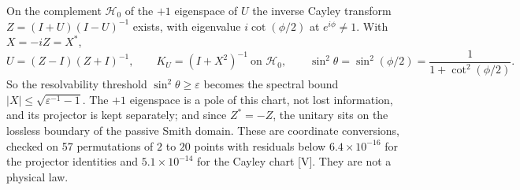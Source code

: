 \documentclass[11pt]{article}
\theoremstyle{remark}\newtheorem{remark}[theorem]{Remark}
\begin{document}
On the complement $\mathcal H_0$ of the $+1$ eigenspace of $U$ the inverse Cayley transform $Z=(I+U)(I-U)^{-1}$ exists, with eigenvalue $i\cot(\phi/2)$ at $e^{i\phi}\ne1$. With $X=-iZ=X^*$,
\[
U=(Z-I)(Z+I)^{-1},\qquad K_U=(I+X^2)^{-1}\ \text{on }\mathcal H_0,\qquad \sin^2\theta=\sin^2(\phi/2)=\frac1{1+\cot^2(\phi/2)} .
\]
So the resolvability threshold $\sin^2\theta\ge\varepsilon$ becomes the spectral bound $|X|\le\sqrt{\varepsilon^{-1}-1}$. The $+1$ eigenspace is a pole of this chart, not lost information, and its projector is kept separately; and since $Z^*=-Z$, the unitary sits on the lossless boundary of the passive Smith domain. These are coordinate conversions, checked on 57 permutations of $2$ to $20$ points with residuals below $6.4\times10^{-16}$ for the projector identities and $5.1\times10^{-14}$ for the Cayley chart [V]. They are not a physical law.
\end{document}

